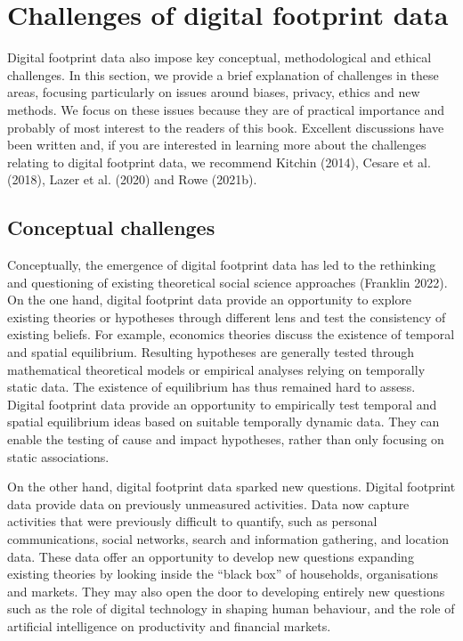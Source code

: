\documentclass[
  letterpaper,
  DIV=11,
  numbers=noendperiod]{scrreprt}
\begin{document}
\hypertarget{challenges-of-digital-footprint-data}{%
\section{Challenges of digital footprint
data}\label{challenges-of-digital-footprint-data}}

Digital footprint data also impose key conceptual, methodological and
ethical challenges. In this section, we provide a brief explanation of
challenges in these areas, focusing particularly on issues around
biases, privacy, ethics and new methods. We focus on these issues
because they are of practical importance and probably of most interest
to the readers of this book. Excellent discussions have been written
and, if you are interested in learning more about the challenges
relating to digital footprint data, we recommend Kitchin (2014), Cesare
et al. (2018), Lazer et al. (2020) and Rowe (2021b).

\hypertarget{conceptual-challenges}{%
\subsection{Conceptual challenges}\label{conceptual-challenges}}

Conceptually, the emergence of digital footprint data has led to the
rethinking and questioning of existing theoretical social science
approaches (Franklin 2022). On the one hand, digital footprint data
provide an opportunity to explore existing theories or hypotheses
through different lens and test the consistency of existing beliefs. For
example, economics theories discuss the existence of temporal and
spatial equilibrium. Resulting hypotheses are generally tested through
mathematical theoretical models or empirical analyses relying on
temporally static data. The existence of equilibrium has thus remained
hard to assess. Digital footprint data provide an opportunity to
empirically test temporal and spatial equilibrium ideas based on
suitable temporally dynamic data. They can enable the testing of cause
and impact hypotheses, rather than only focusing on static associations.

On the other hand, digital footprint data sparked new questions. Digital
footprint data provide data on previously unmeasured activities. Data
now capture activities that were previously difficult to quantify, such
as personal communications, social networks, search and information
gathering, and location data. These data offer an opportunity to develop
new questions expanding existing theories by looking inside the ``black
box'' of households, organisations and markets. They may also open the
door to developing entirely new questions such as the role of digital
technology in shaping human behaviour, and the role of artificial
intelligence on productivity and financial markets.
\end{document}
